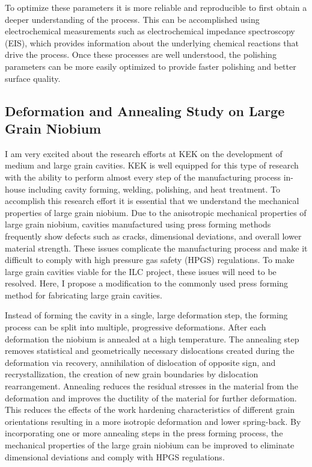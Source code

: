\documentclass[]{revtex4-2}
\begin{document}
    To optimize these parameters it is more reliable and reproducible to first obtain a deeper understanding of the process. This can be accomplished using electrochemical measurements such as electrochemical impedance spectroscopy (EIS), which provides information about the underlying chemical reactions that drive the process. Once these processes are well understood, the polishing parameters can be more easily optimized to provide faster polishing and better surface quality.

    

\subsection{Deformation and Annealing Study on Large Grain Niobium}

    I am very excited about the research efforts at KEK on the development of medium and large grain cavities. KEK is well equipped for this type of research with the ability to perform almost every step of the manufacturing process in-house including cavity forming, welding, polishing, and heat treatment. To accomplish this research effort it is essential that we understand the mechanical properties of large grain niobium. Due to the anisotropic mechanical properties of large grain niobium, cavities manufactured using press forming methods frequently show defects such as cracks, dimensional deviations, and overall lower material strength. These issues complicate the manufacturing process and make it difficult to comply with high pressure gas safety (HPGS) regulations. To make large grain cavities viable for the ILC project, these issues will need to be resolved. Here, I propose a modification to the commonly used press forming method for fabricating large grain cavities.

    Instead of forming the cavity in a single, large deformation step, the forming process can be split into multiple, progressive deformations. After each deformation the niobium is annealed at a high temperature. The annealing step removes statistical and geometrically necessary dislocations created during the deformation via recovery, annihilation of dislocation of opposite sign, and recrystallization, the creation of new grain boundaries by dislocation rearrangement. Annealing reduces the residual stresses in the material from the deformation and improves the ductility of the material for further deformation. This reduces the effects of the work hardening characteristics of different grain orientations resulting in a more isotropic deformation and lower spring-back. By incorporating one or more annealing steps in the press forming process, the mechanical properties of the large grain niobium can be improved to eliminate dimensional deviations and comply with HPGS regulations.
\end{document}
